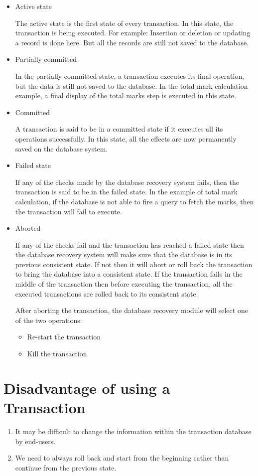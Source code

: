 \documentclass{article}
\begin{document}
\begin{itemize}

\item Active state

The active state is the first state of every transaction. In this state, the transaction is being executed.
For example: Insertion or deletion or updating a record is done here. But all the records are still not saved to the database.

\item Partially committed

In the partially committed state, a transaction executes its final operation, but the data is still not saved to the database.
In the total mark calculation example, a final display of the total marks step is executed in this state.

\item Committed

A transaction is said to be in a committed state if it executes all its operations successfully. In this state, all the effects are now permanently saved on the database system.

\item Failed state

If any of the checks made by the database recovery system fails, then the transaction is said to be in the failed state.
In the example of total mark calculation, if the database is not able to fire a query to fetch the marks, then the transaction will fail to execute.

\item Aborted

If any of the checks fail and the transaction has reached a failed state then the database recovery system will make sure that the database is in its previous consistent state. If not then it will abort or roll back the transaction to bring the database into a consistent state.
If the transaction fails in the middle of the transaction then before executing the transaction, all the executed transactions are rolled back to its consistent state.

After aborting the transaction, the database recovery module will select one of the two operations:
\begin{itemize}
\item Re-start the transaction
\item Kill the transaction
\end{itemize}

\end{itemize}

\section{Disadvantage of using a Transaction} 

\begin{enumerate}

\item It may be difficult to change the information within the transaction database by end-users.
\item We need to always roll back and start from the beginning rather than continue from the previous state.

\end{enumerate}
\end{document}
